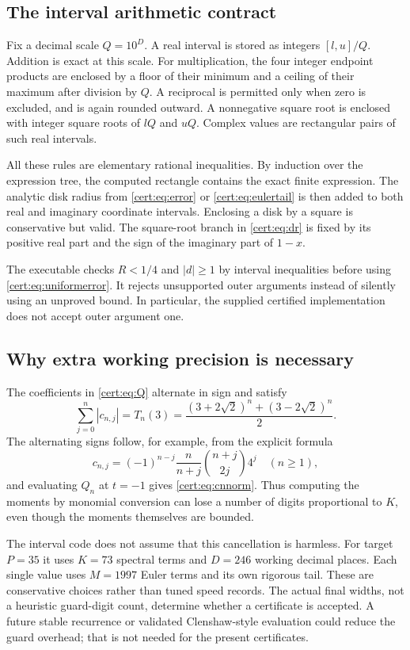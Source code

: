 \subsection{The interval arithmetic contract}
Fix a decimal scale $Q=10^D$. A real interval is stored as integers
$[l,u]/Q$. Addition is exact at this scale. For multiplication, the four
integer endpoint products are enclosed by a floor of their minimum
and a ceiling of their maximum after division by $Q$.
A reciprocal is permitted only when zero is excluded, and is again
rounded outward. A nonnegative square root is enclosed with integer
square roots of $lQ$ and $uQ$. Complex values are rectangular pairs of
such real intervals.

All these rules are elementary rational inequalities. By induction over
the expression tree, the computed rectangle contains the exact finite
expression. The analytic disk radius from \eqref{cert:eq:error} or
\eqref{cert:eq:eulertail} is then added to both real and imaginary coordinate
intervals. Enclosing a disk by a square is conservative but valid.
The square-root branch in \eqref{cert:eq:dr} is fixed by its positive real
part and the sign of the imaginary part of $1-x$.

The executable checks $R<1/4$ and $|d|\ge1$ by interval inequalities
before using \eqref{cert:eq:uniformerror}. It rejects unsupported outer
arguments instead of silently using an unproved bound. In particular,
the supplied certified implementation does not accept outer argument one.

\subsection{Why extra working precision is necessary}
The coefficients in \eqref{cert:eq:Q} alternate in sign and satisfy
\begin{equation}
 \sum_{j=0}^n|c_{n,j}|=T_n(3)
 =\frac{(3+2\sqrt2)^n+(3-2\sqrt2)^n}{2}.
\label{cert:eq:cnnorm}
\end{equation}
The alternating signs follow, for example, from the explicit formula
\[
 c_{n,j}=(-1)^{n-j}\frac{n}{n+j}\binom{n+j}{2j}4^j
 \quad(n\ge1),
\]
and evaluating $Q_n$ at $t=-1$ gives \eqref{cert:eq:cnnorm}.
Thus computing the moments by monomial conversion can lose a number of
digits proportional to $K$, even though the moments themselves are bounded.

The interval code does not assume that this cancellation is harmless.
For target $P=35$ it uses $K=73$ spectral terms and $D=246$ working decimal
places. Each single value uses $M=1997$ Euler terms and its own rigorous
tail. These are conservative choices rather than tuned speed records.
The actual final widths, not a heuristic guard-digit count, determine
whether a certificate is accepted. A future stable recurrence or validated
Clenshaw-style evaluation could reduce the guard overhead; that is not
needed for the present certificates.
